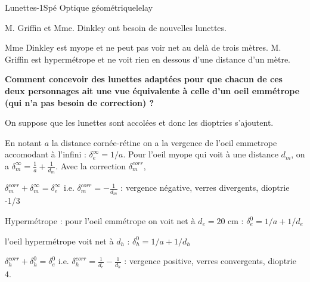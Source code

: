 \begin{exercise}{Lunettes}{-1}{Spé}
{Optique géométrique}{lelay}

M. Griffin et Mme. Dinkley ont besoin de nouvelles lunettes. 

Mme Dinkley est myope et ne peut pas voir net au delà de trois mètres. M. Griffin est hypermétrope et ne voit rien en dessous d'une distance d'un mètre.

\textbf{Comment concevoir des lunettes adaptées pour que chacun de ces deux personnages ait une vue équivalente à celle d'un oeil emmétrope (qui n'a pas besoin de correction) ?}

\end{exercise}

\begin{solution}
On suppose que les lunettes sont accolées et donc les dioptries s'ajoutent.

En notant $a$ la distance cornée-rétine on a la vergence de l'oeil emmetrope accomodant à l'infini : $\delta_e^\infty = 1/a$. Pour l'oeil myope qui voit à une distance $d_m$, on a $\delta_m^\infty = \frac1a + \frac1{d_m}$. Avec la correction $\delta_m^{corr}$, 

$\delta_m^{corr} + \delta_m^\infty = \delta_e^\infty$ i.e. $\delta_m^{corr} = -\frac1{d_m}$ : vergence négative, verres divergents, dioptrie -1/3

Hypermétrope : pour l'oeil emmétrope on voit net à $d_e = 20$ cm : $\delta_e^0 = 1/a + 1/d_e$

l'oeil hypermétrope voit net à $d_h$ : $\delta_h^0 = 1/a + 1/d_h$

$\delta_h^{corr} + \delta_h^0 = \delta_e^0$ i.e. $\delta_h^{corr} = \frac{1}{d_e}-\frac1{d_h}$ : vergence positive, verres convergents, dioptrie 4.
\end{solution}